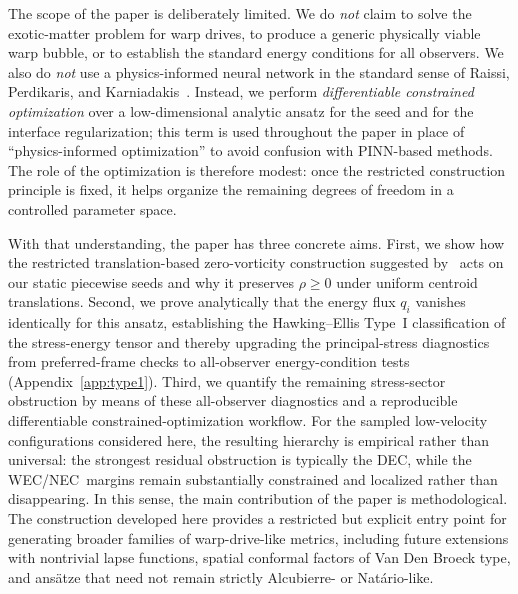 \documentclass[11pt]{article}
\makeatletter
\newcommand{\@abbr}[1]{\ifmmode\mathrm{#1}\else\textsc{#1}\fi}
\newcommand{\WEC}{\@abbr{WEC}}
\newcommand{\NEC}{\@abbr{NEC}}
\newcommand{\DEC}{\@abbr{DEC}}
\makeatother
\begin{document}
The scope of the paper is deliberately limited. We do \emph{not} claim to solve the exotic-matter problem for warp drives, to produce a generic physically viable warp bubble, or to establish the standard energy conditions for all observers. We also do \emph{not} use a physics-informed neural network in the standard sense of Raissi, Perdikaris, and Karniadakis~\cite{Raissi:2019PINN}. Instead, we perform \emph{differentiable constrained optimization} over a low-dimensional analytic ansatz for the seed and for the interface regularization; this term is used throughout the paper in place of ``physics-informed optimization'' to avoid confusion with PINN-based methods. The role of the optimization is therefore modest: once the restricted construction principle is fixed, it helps organize the remaining degrees of freedom in a controlled parameter space.

With that understanding, the paper has three concrete aims. First, we show how the restricted translation-based zero-vorticity construction suggested by~\cite{Santiago:2021aup,Schuster:2023ADMmass} acts on our static piecewise seeds and why it preserves $\rho\ge 0$ under uniform centroid translations. Second, we prove analytically that the energy flux $q_i$ vanishes identically for this ansatz, establishing the Hawking--Ellis Type~I classification of the stress-energy tensor and thereby upgrading the principal-stress diagnostics from preferred-frame checks to all-observer energy-condition tests (Appendix~\ref{app:type1}). Third, we quantify the remaining stress-sector obstruction by means of these all-observer diagnostics and a reproducible differentiable constrained-optimization workflow. For the sampled low-velocity configurations considered here, the resulting hierarchy is empirical rather than universal: the strongest residual obstruction is typically the \DEC, while the \WEC/\NEC\ margins remain substantially constrained and localized rather than disappearing. In this sense, the main contribution of the paper is methodological. The construction developed here provides a restricted but explicit entry point for generating broader families of warp-drive-like metrics, including future extensions with nontrivial lapse functions, spatial conformal factors of Van Den Broeck type, and ans\"atze that need not remain strictly Alcubierre- or Nat\'ario-like.
\end{document}
